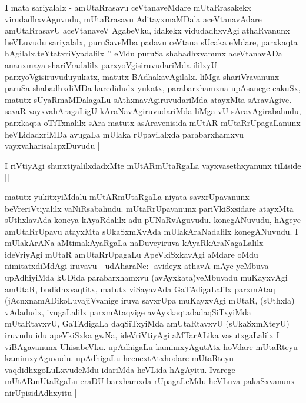 \begin{artha}
{\textbf I mata sariyalalx -} amUtaRrasavu ceVtanaveMdare
mUtaRrasakekx virudadhxvAguvudu, mUtaRrasavu AditayxmaMDala
aceVtanavAdare amUtaRrasavU aceVtanaveV AgabeVku, idakekx
vidudadhxvAgi athaRvanunx heVLuvudu sariyalalx, puruSaveMba padavu
ceVtana sUcaka eMdare, parxkaqta hAgilalx,teYtatxriVyadalilx '\stext'
eMdu puruSa shabadhxvanunx aceVtanavADa ananxmaya shariVradalilx
parxyoVgisiruvudariMda ililxyU parxyoVgisiruvuduyukatx, matutx
BAdhakavAgilalx. liMga shariVravanunx paruSa shabadhxdiMDa karedidudx
yukatx, parabarxhamxna upAsanege cakuSx, matutx sUyaRmaMDalagaLu
sAthxnavAgiruvudariMda atayxMta sAravAgive. savaR vayxvahAragaLigU
kAraNavAgiruvudariMda liMga vU sAravAgirabahudu, parxkaqta oTiTxnalilx
sAra matutx asAravenisida mUtAR mUtaRrUpagaLanunx heVLidadxriMDa
avugaLa mUlaka rUpavilalxda parabarxhamxvu vayxvaharisalapxDuvudu ||
\end{artha}

\begin{artha}
I riVtiyAgi shurxtiyalilxdadxMte mUtARmUtaRgaLa vayxvasethxyanunx
tiLiside ||
\end{artha}


\begin{center}


\end{center}


\begin{artha}
matutx yukitxyiMdalu mUtARmUtaRgaLa niyata savxrUpavanunx
beVreriVtiyalilx vaNiRsabahudu. mUtaRrUpavanunx pariVkiSxsidare
atayxMta sUthxlavAda koneya kAyaRdalilx adu
pUNaRvAguvudu. konegANuvudu, hAgeye amUtaRrUpavu atayxMta sUkaSxmXvAda
mUlakAraNadalilx konegANuvudu. I mUlakArANa aMtimakAyaRgaLa
naDuveyiruva kAyaRkAraNagaLalilx ideVriyAgi mUtaR amUtaRrUpagaLu
ApeVkiSxkavAgi aMdare oMdu nimitatxdiMdAgi iruvavu - udAharaNe:-
avideyx athavA mAye yeMbuva upAdhiyiMda kUDida parabarxhamxvu
(avAyxkata)veMbuvadu muKayxvAgi amUtaR, budidhxvaqtitx, matutx
viSayavAda GaTAdigaLalilx parxmAtaq (jAcnxnamADikoLuvajiVvanige iruva
savxrUpa muKayxvAgi mUtaR, (sUthxla) vAdadudx, ivugaLalilx
parxmAtaqvige avAyxkaqtadadaqSiTxyiMda mUtaRtavxvU, GaTAdigaLa
daqSiTxyiMda amUtaRtavxvU (sUkaSxmXteyU) iruvudu idu apeVkiSxka gwNa,
ideVriVtiyAgi aMTarALika vasutxgaLalilx I viBAgavanunx
UhisabeVku. upAdhigaLu kamimxyAgutAtx hoVdare mUtaRteyu
kamimxyAguvudu. upAdhigaLu hecucxtAtxhodare mUtaRteyu
vaqdidhxgoLuLxvudeMdu idariMda heVLida hAgAyitu. Ivarege
mUtARmUtaRgaLu eraDU barxhamxda rUpagaLeMdu heVLuva pakaSxvanunx
nirUpisidAdhxyitu || 
\end{artha}

